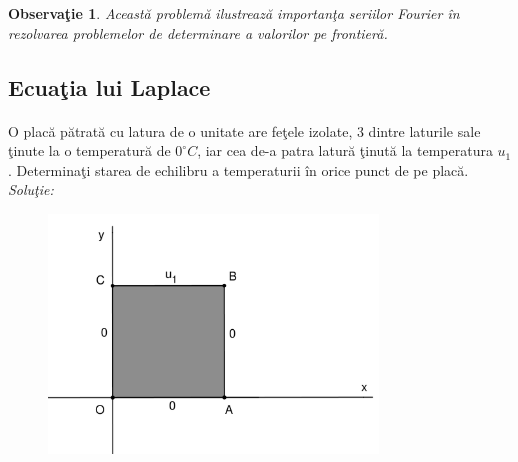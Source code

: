 \documentclass[a4paper,openany,12pt]{report}
\newtheorem{notice}{Observa\c tie}[section]
\begin{document}
\begin{notice}
Aceast\u a problem\u a ilustreaz\u a importan\c ta seriilor Fourier \^ in rezolvarea problemelor de determinare a valorilor pe frontier\u a. 
\end{notice}


\subsection*{Ecua\c tia lui Laplace}
\paragraph*{} O plac\u a p\u atrat\u a cu latura de o unitate are fe\c tele izolate, 3 dintre laturile sale \c tinute la o temperatur\u a de $0^\circ C$, iar cea de-a patra latur\u a \c tinut\u a la temperatura $u_1$. Determina\c ti starea de echilibru a temperaturii \^ in orice punct de pe plac\u a.
\newline
\newline
\textit{Solu\c tie:}
\begin{figure}[H]
\centering
\includegraphics[height=2.5in]{Laplace.pdf} 
\caption{}
\end{figure}
\end{document}
